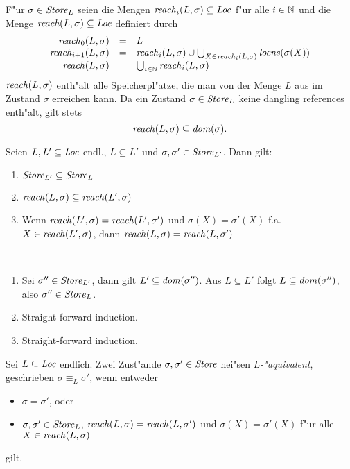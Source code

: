 \documentclass[12pt,a4paper,bigheadings]{scrartcl}
\newcommand{\locns}{\name{locns}}
\newcommand{\reach}{\name{reach}}
\begin{document}
F"ur $\sigma\in{\text{\it Store\/}}_L$ seien die Mengen ${\text{\it reach\/}}_i(L,\sigma)\subseteq {\text{\it Loc\/}}$ f"ur alle
$i\in{\mathord{\mathbb N}}$ und die Menge ${\text{\it reach\/}}(L,\sigma)\subseteq{\text{\it Loc\/}}$ definiert durch
\[\begin{array}{rcl}
  \name{reach}_0(L,\sigma) & = & L \\
  \name{reach}_{i+1}(L,\sigma) & = & \name{reach}_i(L,\sigma)
             \cup \bigcup_{X\in\name{reach}_i(L,\sigma)} \locns(\sigma(X)) \\
  \name{reach}(L,\sigma) & = & \bigcup_{i\in\setN} \name{reach}_i(L,\sigma)
\end{array}\]
${\text{\it reach\/}}(L,\sigma)$ enth"alt alle Speicherpl"atze, die man von der Menge $L$ aus im
Zustand $\sigma$ erreichen kann. Da ein Zustand $\sigma\in{\text{\it Store\/}}_L$ keine dangling references
enth"alt, gilt stets
\[
  {\text{\it reach\/}}(L,\sigma) \subseteq {\text{\it dom\/}}(\sigma).
\]

\begin{lemma} \label{lemma:Store_L_und_reach}
  Seien $L,L'\subseteq{\text{\it Loc\/}}$ endl., $L \subseteq L'$ und $\sigma,\sigma'\in{\text{\it Store\/}}_{L'}$. Dann gilt:
  \begin{enumerate}
    \item ${\text{\it Store\/}}_{L'} \subseteq {\text{\it Store\/}}_{L}$
    \item $\reach(L,\sigma) \subseteq \reach(L',\sigma)$
    \item Wenn $\reach(L',\sigma) = \reach(L',\sigma')$ und $\sigma(X) = \sigma'(X)$ f.a.
          $X\in\reach(L',\sigma)$, dann $\reach(L,\sigma) = \reach(L,\sigma')$
  \end{enumerate}
\end{lemma}

\begin{beweis} \
  \begin{enumerate}
    \item Sei $\sigma''\in{\text{\it Store\/}}_{L'}$, dann gilt $L' \subseteq {\text{\it dom\/}}(\sigma'')$. Aus $L \subseteq L'$ folgt
          $L\subseteq{\text{\it dom\/}}(\sigma'')$, also $\sigma''\in{\text{\it Store\/}}_L$.
    \item Straight-forward induction.
    \item Straight-forward induction.
  \end{enumerate}
\end{beweis}

\begin{definition}[$L$-"Aquivalenz]
  Sei $L \subseteq {\text{\it Loc\/}}$ endlich. Zwei Zust"ande $\sigma,\sigma'\in{\text{\it Store\/}}$ hei"sen {\em $L$-"aquivalent}, geschrieben
  $\sigma \equiv_L \sigma'$, wenn entweder
  \begin{itemize}
    \item $\sigma = \sigma'$, oder
    \item $\sigma,\sigma'\in{\text{\it Store\/}}_L$, ${\text{\it reach\/}}(L,\sigma) = {\text{\it reach\/}}(L,\sigma')$
          und $\sigma(X) = \sigma'(X)$ f"ur alle $X \in \reach(L,\sigma)$
  \end{itemize}
  gilt.
\end{definition}
\end{document}
